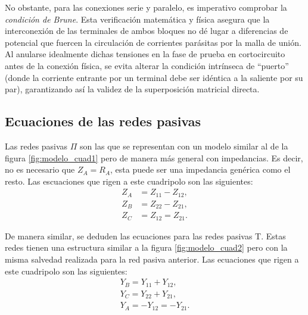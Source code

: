 No obstante, para las conexiones serie y paralelo, es imperativo comprobar la \textit{condición de Brune}. Esta verificación matemática y física asegura que la interconexión de las terminales de ambos bloques no dé lugar a diferencias de potencial que fuercen la circulación de corrientes parásitas por la malla de unión. Al anularse idealmente dichas tensiones en la fase de prueba en cortocircuito antes de la conexión física, se evita alterar la condición intrínseca de ``puerto'' (donde la corriente entrante por un terminal debe ser idéntica a la saliente por su par), garantizando así la validez de la superposición matricial directa.


\subsection{Ecuaciones de las redes pasivas}

Las redes pasivas $\Pi$ son las que se representan con un modelo similar al de la figura \ref{fig:modelo_cuad1} pero de manera más general con impedancias. Es decir, no es necesario que $Z_A = R_A$, esta puede ser una impedancia genérica como el resto. Las escuaciones que rigen a este cuadripolo son las siguientes:
\begin{equation}
\begin{aligned}
    Z_A &= Z_{11} - Z_{12},\\
    Z_B &= Z_{22} - Z_{21},\\
    Z_C &= Z_{12} = Z_{21}.
\end{aligned}
\label{eq:Z_T}
\end{equation}

De manera similar, se deduden las ecuaciones para las redes pasivas T. Estas redes tienen una estructura similar a la figura \ref{fig:modelo_cuad2} pero con la misma salvedad realizada para la red pasiva anterior. Las ecuaciones que rigen a este cuadripolo son las siguientes:
\begin{equation}
    \begin{aligned}
    Y_B = Y_{11} + Y_{12}, \\
    Y_C = Y_{22} + Y_{21}, \\
    Y_A = -Y_{12} = -Y_{21}.
    \end{aligned}
    \label{eq:Y_pi}
\end{equation}



\newpage
